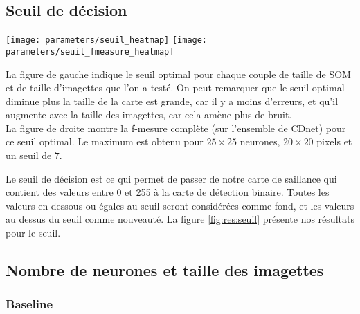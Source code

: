 	\subsection{Seuil de décision}

	\begin{figureth}
		\texttt{[image: parameters/seuil\_heatmap]}
		\texttt{[image: parameters/seuil\_fmeasure\_heatmap]}
		\caption[Seuil de décision]{La figure de gauche indique le seuil optimal pour chaque couple de taille de SOM et de taille d'imagettes que l'on a testé. On peut remarquer que le seuil optimal diminue plus la taille de la carte est grande, car il y a moins d'erreurs, et qu'il augmente avec la taille des imagettes, car cela amène plus de bruit.\\

		La figure de droite montre la f-mesure complète (sur l'ensemble de CDnet) pour ce seuil optimal. Le maximum est obtenu pour $25\times25$ neurones, $20\times20$ pixels et un seuil de $7$.}\label{fig:res:seuil}
	\end{figureth}

	Le seuil de décision est ce qui permet de passer de notre carte de saillance qui contient des valeurs entre 0 et 255 à la carte de détection binaire. Toutes les valeurs en dessous ou égales au seuil seront considérées comme fond, et les valeurs au dessus du seuil comme nouveauté. La figure \ref{fig:res:seuil} présente nos résultats pour le seuil.

	\subsection{Nombre de neurones et taille des imagettes}

	\subsubsection{Baseline}

